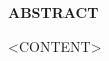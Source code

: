 \pagestyle{empty}
\begin{center}
\textup{\Large{\textbf{ABSTRACT}}}
\end{center}

\justify
\indent
<CONTENT>
\pagebreak
